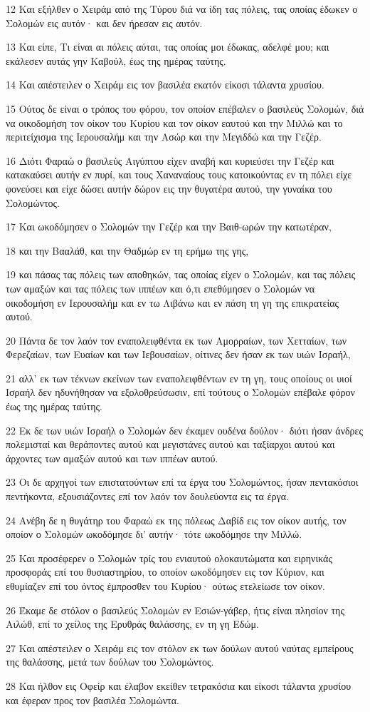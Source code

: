 \par 12 Και εξήλθεν ο Χειράμ από της Τύρου διά να ίδη τας πόλεις, τας οποίας έδωκεν ο Σολομών εις αυτόν· και δεν ήρεσαν εις αυτόν.
\par 13 Και είπε, Τι είναι αι πόλεις αύται, τας οποίας μοι έδωκας, αδελφέ μου; και εκάλεσεν αυτάς γην Καβούλ, έως της ημέρας ταύτης.
\par 14 Και απέστειλεν ο Χειράμ εις τον βασιλέα εκατόν είκοσι τάλαντα χρυσίου.
\par 15 Ούτος δε είναι ο τρόπος του φόρου, τον οποίον επέβαλεν ο βασιλεύς Σολομών, διά να οικοδομήση τον οίκον του Κυρίου και τον οίκον εαυτού και την Μιλλώ και το περιτείχισμα της Ιερουσαλήμ και την Ασώρ και την Μεγιδδώ και την Γεζέρ.
\par 16 Διότι Φαραώ ο βασιλεύς Αιγύπτου είχεν αναβή και κυριεύσει την Γεζέρ και κατακαύσει αυτήν εν πυρί, και τους Χαναναίους τους κατοικούντας εν τη πόλει είχε φονεύσει και είχε δώσει αυτήν δώρον εις την θυγατέρα αυτού, την γυναίκα του Σολομώντος.
\par 17 Και ωκοδόμησεν ο Σολομών την Γεζέρ και την Βαιθ-ωρών την κατωτέραν,
\par 18 και την Βααλάθ, και την Θαδμώρ εν τη ερήμω της γης,
\par 19 και πάσας τας πόλεις των αποθηκών, τας οποίας είχεν ο Σολομών, και τας πόλεις των αμαξών και τας πόλεις των ιππέων και ό,τι επεθύμησεν ο Σολομών να οικοδομήση εν Ιερουσαλήμ και εν τω Λιβάνω και εν πάση τη γη της επικρατείας αυτού.
\par 20 Πάντα δε τον λαόν τον εναπολειφθέντα εκ των Αμορραίων, των Χετταίων, των Φερεζαίων, των Ευαίων και των Ιεβουσαίων, οίτινες δεν ήσαν εκ των υιών Ισραήλ,
\par 21 αλλ' εκ των τέκνων εκείνων των εναπολειφθέντων εν τη γη, τους οποίους οι υιοί Ισραήλ δεν ηδυνήθησαν να εξολοθρεύσωσιν, επί τούτους ο Σολομών επέβαλε φόρον έως της ημέρας ταύτης.
\par 22 Εκ δε των υιών Ισραήλ ο Σολομών δεν έκαμεν ουδένα δούλον· διότι ήσαν άνδρες πολεμισταί και θεράποντες αυτού και μεγιστάνες αυτού και ταξίαρχοι αυτού και άρχοντες των αμαξών αυτού και των ιππέων αυτού.
\par 23 Οι δε αρχηγοί των επιστατούντων επί τα έργα του Σολομώντος, ήσαν πεντακόσιοι πεντήκοντα, εξουσιάζοντες επί τον λαόν τον δουλεύοντα εις τα έργα.
\par 24 Ανέβη δε η θυγάτηρ του Φαραώ εκ της πόλεως Δαβίδ εις τον οίκον αυτής, τον οποίον ο Σολομών ωκοδόμησε δι' αυτήν· τότε ωκοδόμησε την Μιλλώ.
\par 25 Και προσέφερεν ο Σολομών τρίς του ενιαυτού ολοκαυτώματα και ειρηνικάς προσφοράς επί του θυσιαστηρίου, το οποίον ωκοδόμησεν εις τον Κύριον, και εθυμίαζεν επί του όντος έμπροσθεν του Κυρίου· ούτως ετελείωσε τον οίκον.
\par 26 Έκαμε δε στόλον ο βασιλεύς Σολομών εν Εσιών-γάβερ, ήτις είναι πλησίον της Αιλώθ, επί το χείλος της Ερυθράς θαλάσσης, εν τη γη Εδώμ.
\par 27 Και απέστειλεν ο Χειράμ εις τον στόλον εκ των δούλων αυτού ναύτας εμπείρους της θαλάσσης, μετά των δούλων του Σολομώντος.
\par 28 Και ήλθον εις Οφείρ και έλαβον εκείθεν τετρακόσια και είκοσι τάλαντα χρυσίου και έφεραν προς τον βασιλέα Σολομώντα.

